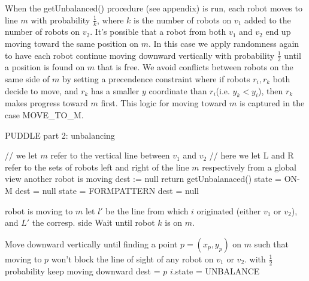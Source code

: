 \documentclass[preprint,10pt]{elsarticle}
\begin{document}
	When the getUnbalanced() procedure (see appendix) is run, each robot moves to line $m$ with probability 
	$\frac{1}{k}$, where $k$ is the number of robots on $v_1$ added to the number of robots on $v_2$.
	It's possible that a robot from both $v_1$ and $v_2$ end up moving toward the same position on 
	$m$. In this case we apply randomness again to have each robot continue moving downward vertically
	with probability $\frac{1}{2}$ until a position is found on $m$ that is free. We avoid
	conflicts between robots on the same side of $m$ by setting a precendence constraint where if robots 
	$r_i,r_k$ both decide to move, and $r_k$ has a smaller $y$ coordinate than $r_i$(i.e. $y_k < y_i$), then $r_k$ makes
	progress toward $m$ first. This logic for moving toward $m$ is captured in the case
	MOVE\_TO\_M.

	\begin{algorithm}[H]
	\begin{algorithmic}[1]
	\caption{PUDDLE part 2: unbalancing}
		
			\State //  we let $m$ refer to the vertical line between $v_1$ and $v_2$
			\State // here we let L and R refer to the sets of robots left and right of the line $m$ respectively from a global view
			\State
				 \Comment another robot is moving
					\State dest := null
					\State return
				\EndIf
					\State getUnbalanaced()
					\State state = ON-M
					\State dest = null
				\Else
					\State state = FORMPATTERN
					\State dest = null
				\EndIf
			\EndCase

				\Comment robot is moving to $m$
					\State let $l'$ be the line from which $i$ originated (either $v_1$ or $v_2$), and $L'$ the corresp. side
						\State Wait until robot $k$ is on $m$.
					\EndWhile

					\State Move downward vertically until finding a point $p = (x_p, y_p)$ on $m$ such that 
						moving to $p$ won't block the line of sight of any robot on $v_1$ or $v_2$.
						\State with $\frac{1}{2}$ probability keep moving downward
					\EndWhile
						\State dest = $p$
						\State $i$.state = UNBALANCE
			\EndCase
			\State
	\EndProcedure
	\end{algorithmic}
	\end{algorithm}
\end{document}
